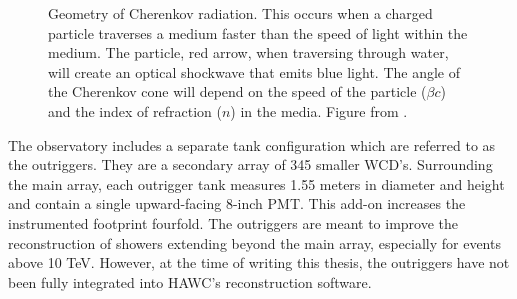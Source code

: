 \begin{figure}
    \caption{Geometry of Cherenkov radiation. This occurs when a charged particle traverses a medium faster than the speed of light within the medium. The particle, red arrow, when traversing through water, will create an optical shockwave that emits blue light. The angle of the Cherenkov cone will depend on the speed of the particle ($\beta c$) and the index of refraction ($n$) in the media. Figure from \cite{Cherenkov_front}.}
    \label{fig:Cherenkov_front}
\end{figure}

The observatory includes a separate tank configuration which are referred to as the outriggers.
They are a secondary array of 345 smaller WCD's.
Surrounding the main array, each outrigger tank measures 1.55 meters in diameter and height and contain a single upward-facing 8-inch PMT.
This add-on increases the instrumented footprint fourfold.
The outriggers are meant to improve the reconstruction of showers extending beyond the main array, especially for events above 10 TeV.
However, at the time of writing this thesis, the outriggers have not been fully integrated into HAWC's reconstruction software.

